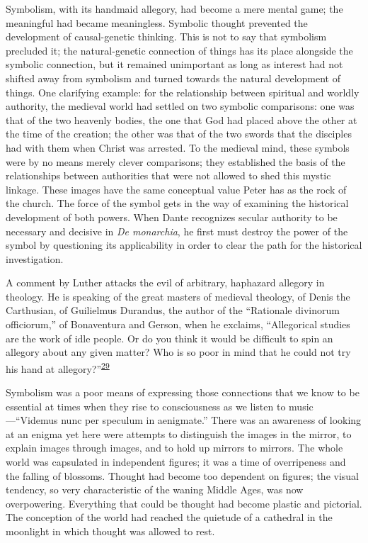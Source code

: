 Symbolism, with its handmaid allegory, had become a mere mental game;
the meaningful had became meaningless. Symbolic thought prevented the
development of causal-genetic thinking. This is not to say that
symbolism precluded it; the natural-genetic connection of things has its
place alongside the symbolic connection, but it remained unimportant as
long as interest had not shifted away from symbolism and turned towards
the natural development of things. One clarifying example: for the
relationship between spiritual and worldly authority, the medieval world
had settled on two symbolic comparisons: one was that of the two
heavenly bodies, the one that God had placed above the other at the time
of the creation; the other was that of the two swords that the disciples
had with them when Christ was arrested. To the medieval mind, these
symbols were by no means merely clever comparisons; they established the
basis of the relationships between authorities that were not allowed to
shed this mystic linkage. These images have the same conceptual value
Peter has as the rock of the church. The force of the symbol gets in the
way of examining the historical development of both powers. When Dante
recognizes secular
au\protect\hypertarget{16_Chapter_Nine__THE_DECLINE_OF_SYM.xhtmlux5cux23page_248}{}{}thority
to be necessary and decisive in \emph{De monarchia}, he first must
destroy the power of the symbol by questioning its applicability in
order to clear the path for the historical investigation.

A comment by Luther attacks the evil of arbitrary, haphazard allegory in
theology. He is speaking of the great masters of medieval theology, of
Denis the Carthusian, of Guilielmus Durandus, the author of the
``Rationale divinorum officiorum,'' of Bonaventura and Gerson, when he
exclaims, ``Allegorical studies are the work of idle people. Or do you
think it would be difficult to spin an allegory about any given matter?
Who is so poor in mind that he could not try his hand at
allegory?''\textsuperscript{\protect\hypertarget{16_Chapter_Nine__THE_DECLINE_OF_SYM.xhtmlux5cux23id_736}{\protect\hyperlink{23_NOTES.xhtmlux5cux23id_737}{29}}}

Symbolism was a poor means of expressing those connections that we know
to be essential at times when they rise to consciousness as we listen to
music---``Videmus nunc per speculum in aenigmate.'' There was an
awareness of looking at an enigma yet here were attempts to distinguish
the images in the mirror, to explain images through images, and to hold
up mirrors to mirrors. The whole world was capsulated in independent
figures; it was a time of overripeness and the falling of blossoms.
Thought had become too dependent on figures; the visual tendency, so
very characteristic of the waning Middle Ages, was now overpowering.
Everything that could be thought had become plastic and pictorial. The
conception of the world had reached the quietude of a cathedral in the
moonlight in which thought was allowed to rest.

